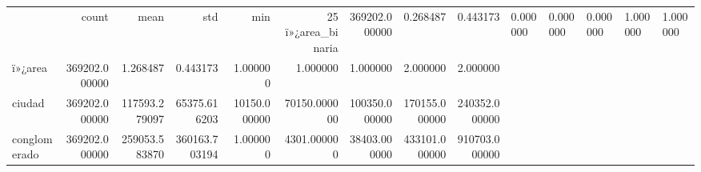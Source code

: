 \begin{tabular}{lrrrrrrrr}
\toprule
 & count & mean & std & min & 25%
\midrule
ï»¿area_binaria & 369202.000000 & 0.268487 & 0.443173 & 0.000000 & 0.000000 & 0.000000 & 1.000000 & 1.000000 \\
ï»¿area & 369202.000000 & 1.268487 & 0.443173 & 1.000000 & 1.000000 & 1.000000 & 2.000000 & 2.000000 \\
ciudad & 369202.000000 & 117593.279097 & 65375.616203 & 10150.000000 & 70150.000000 & 100350.000000 & 170155.000000 & 240352.000000 \\
conglomerado & 369202.000000 & 259053.583870 & 360163.703194 & 1.000000 & 4301.000000 & 38403.000000 & 433101.000000 & 910703.000000 \\
\bottomrule
\end{tabular}
